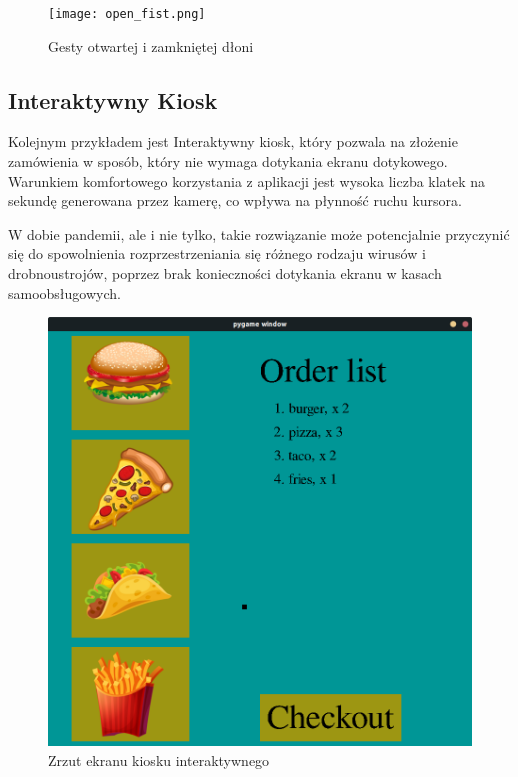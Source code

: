 \begin{figure}[H]
    \begin{center}
        \texttt{[image: open\_fist.png]}
        \caption{Gesty otwartej i zamkniętej dłoni}
    \end{center}
\end{figure}

\subsection{Interaktywny Kiosk}
\quad Kolejnym przykładem jest Interaktywny kiosk, który pozwala na złożenie zamówienia w sposób, który nie wymaga dotykania ekranu dotykowego. Warunkiem komfortowego korzystania z aplikacji jest wysoka liczba klatek na sekundę generowana przez kamerę, co wpływa na płynność ruchu kursora. 

\quad W dobie pandemii, ale i nie tylko, takie rozwiązanie może potencjalnie przyczynić się do spowolnienia rozprzestrzeniania się różnego rodzaju wirusów i drobnoustrojów, poprzez brak konieczności dotykania ekranu w kasach samoobsługowych.

\begin{figure}[H]
    \begin{center}
        \includegraphics[width=15cm]{../images/checkout_window.png}
        \caption{Zrzut ekranu kiosku interaktywnego}
    \end{center}
\end{figure}


